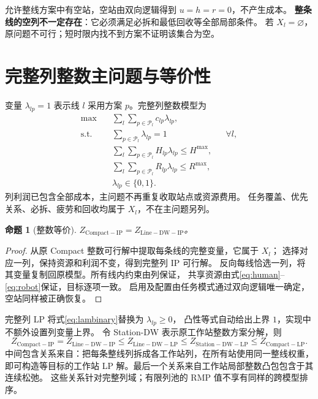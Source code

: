 \documentclass[UTF8,a4paper,11pt]{ctexart}
\newtheorem{proposition}{命题}
\begin{document}
允许整线方案中有空站，空站由双向逻辑得到 $u=h=r=0$，不产生成本。
\textbf{整条线的空列不一定存在}：它必须满足必拆和最低回收等全部局部条件。
若 $X_l=\varnothing$，原问题不可行；短时限内找不到方案不证明该集合为空。

\section{完整列整数主问题与等价性}
变量 $\lambda_{lp}=1$ 表示线 $l$ 采用方案 $p$。完整列整数模型为
\begin{align}
\max\quad &\sum_l\sum_{p\in\mathcal P_l}c_{lp}\lambda_{lp},\label{eq:mpobj}\\
\text{s.t.}\quad &\sum_{p\in\mathcal P_l}\lambda_{lp}=1 &&\forall l,\label{eq:convex}\\
&\sum_l\sum_{p\in\mathcal P_l}H_{lp}\lambda_{lp}\leq H^{\max},\label{eq:human}\\
&\sum_l\sum_{p\in\mathcal P_l}R_{lp}\lambda_{lp}\leq R^{\max},\label{eq:robot}\\
&\lambda_{lp}\in\{0,1\}.\label{eq:lambinary}
\end{align}
列利润已包含全部成本，主问题不再重复收取站点或资源费用。
任务覆盖、优先关系、必拆、疲劳和回收均属于 $X_l$，不在主问题另列。

\begin{proposition}[整数等价]
$Z_{\mathrm{Compact-IP}}=Z_{\mathrm{Line-DW-IP}}$。
\end{proposition}
\begin{proof}
从原 Compact 整数可行解中提取每条线的完整变量，它属于 $X_l$；
选择对应一列，保持资源和利润不变，得到完整列 IP 可行解。
反向每线恰选一列，将其变量复制回原模型。所有线内约束由列保证，
共享资源由式\eqref{eq:human}--\eqref{eq:robot}保证，目标逐项一致。
启用及配置由任务模式通过双向逻辑唯一确定，空站同样被正确恢复。
\end{proof}

完整列 LP 将式\eqref{eq:lambinary}替换为 $\lambda_{lp}\geq0$，
凸性等式自动给出上界 $1$，实现中不额外设置列变量上界。
令 Station-DW 表示原工作站整数方案分解，则
\begin{equation}
Z_{\mathrm{Compact-IP}}=Z_{\mathrm{Line-DW-IP}}
\leq Z_{\mathrm{Line-DW-LP}}
\leq Z_{\mathrm{Station-DW-LP}}
\leq Z_{\mathrm{Compact-LP}}.\label{eq:hierarchy}
\end{equation}
中间包含关系来自：把每条整线列拆成各工作站列，在所有站使用同一整线权重，
即可构造等目标的工作站 LP 解。最后一个关系来自工作站局部整数凸包包含于其连续松弛。
这些关系针对完整列域；有限列池的 RMP 值不享有同样的跨模型排序。
\end{document}
